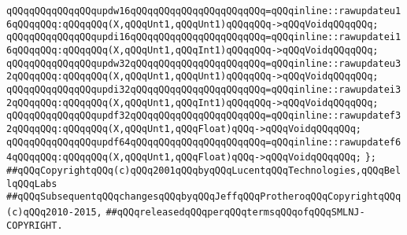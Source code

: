 \verb|qQQqqQQqqQQqqQQqupdw16qQQqqQQqqQQqqQQqqQQqqQQq=qQQqinline::rawupdateu16qQQqqQQq:qQQqqQQq(X,qQQqUnt1,qQQqUnt1)qQQqqQQq->qQQqVoidqQQqqQQq;|\newline
\verb|qQQqqQQqqQQqqQQqupdi16qQQqqQQqqQQqqQQqqQQqqQQq=qQQqinline::rawupdatei16qQQqqQQq:qQQqqQQq(X,qQQqUnt1,qQQqInt1)qQQqqQQq->qQQqVoidqQQqqQQq;|\newline
\verb|qQQqqQQqqQQqqQQqupdw32qQQqqQQqqQQqqQQqqQQqqQQq=qQQqinline::rawupdateu32qQQqqQQq:qQQqqQQq(X,qQQqUnt1,qQQqUnt1)qQQqqQQq->qQQqVoidqQQqqQQq;|\newline
\verb|qQQqqQQqqQQqqQQqupdi32qQQqqQQqqQQqqQQqqQQqqQQq=qQQqinline::rawupdatei32qQQqqQQq:qQQqqQQq(X,qQQqUnt1,qQQqInt1)qQQqqQQq->qQQqVoidqQQqqQQq;|\newline
\verb|qQQqqQQqqQQqqQQqupdf32qQQqqQQqqQQqqQQqqQQqqQQq=qQQqinline::rawupdatef32qQQqqQQq:qQQqqQQq(X,qQQqUnt1,qQQqFloat)qQQq->qQQqVoidqQQqqQQq;|\newline
\verb|qQQqqQQqqQQqqQQqupdf64qQQqqQQqqQQqqQQqqQQqqQQq=qQQqinline::rawupdatef64qQQqqQQq:qQQqqQQq(X,qQQqUnt1,qQQqFloat)qQQq->qQQqVoidqQQqqQQq;|\newline
\verb|};|\newline
\newline
\newline
\verb|##qQQqCopyrightqQQq(c)qQQq2001qQQqbyqQQqLucentqQQqTechnologies,qQQqBellqQQqLabs|\newline
\verb|##qQQqSubsequentqQQqchangesqQQqbyqQQqJeffqQQqProtheroqQQqCopyrightqQQq(c)qQQq2010-2015,|\newline
\verb|##qQQqreleasedqQQqperqQQqtermsqQQqofqQQqSMLNJ-COPYRIGHT.|\newline

